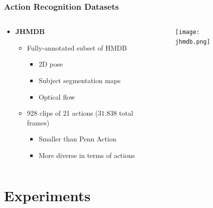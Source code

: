 \documentclass[9pt]{beamer}
\providecommand{\source}{\\ \footnotesize \tugreen{Source:} \footnotemark}
\newenvironment{myframe}[1][]{%
\begin{frame}%
\frametitle{#1}
\setcounter{footnote}{0}


}{%
\end{frame}%
}
\begin{document}
\begin{myframe}[Action Recognition Datasets]
  \begin{columns}[T]
      \begin{column}{.48\textwidth}
          \begin{itemize}
              \item \textbf{JHMDB\footnotemark}
              \begin{itemize}
                  \item Fully-annotated subset of HMDB
                  \begin{itemize}
                      \item 2D pose
                      \item Subject segmentation maps
                      \item Optical flow
                  \end{itemize}
                  \item 928 clips of 21 actions ($31.838$ total frames)
                  \begin{itemize}
                      \item Smaller than Penn Action
                      \item More diverse in terms of actions
                  \end{itemize}
              \end{itemize}
          \end{itemize}
      \end{column}
      \begin{column}{.48\textwidth}
          \begin{figure}
              \texttt{[image: jhmdb.png]}
              \centering
              \source
          \end{figure}
      \end{column}
  \end{columns}
\end{myframe}

\section{Experiments}
\end{document}
